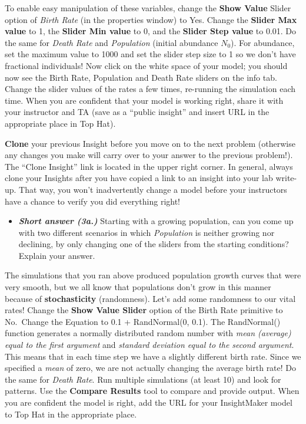 \documentclass[
]{article}
\providecommand{\tightlist}{%
  \setlength{\itemsep}{0pt}\setlength{\parskip}{0pt}}
\begin{document}
To enable easy manipulation of these variables, change the \textbf{Show
Value} Slider option of \emph{Birth Rate} (in the properties window) to
Yes. Change the \textbf{Slider Max value} to 1, the \textbf{Slider Min
value} to 0, and the \textbf{Slider Step value} to 0.01. Do the same for
\emph{Death Rate} and \emph{Population} (initial abundance \(N_0\)). For
abundance, set the maximum value to 1000 and set the slider step size to
1 so we don't have fractional individuals! Now click on the white space
of your model; you should now see the Birth Rate, Population and Death
Rate sliders on the info tab. Change the slider values of the rates a
few times, re-running the simulation each time. When you are confident
that your model is working right, share it with your instructor and TA
(save as a ``public insight'' and insert URL in the appropriate place in
Top Hat).

\textbf{Clone} your previous Insight before you move on to the next
problem (otherwise any changes you make will carry over to your answer
to the previous problem!). The ``Clone Insight'' link is located in the
upper right corner. In general, always clone your Insights after you
have copied a link to an insight into your lab write-up. That way, you
won't inadvertently change a model before your instructors have a chance
to verify you did everything right!

\begin{itemize}
\tightlist
\item
  \textbf{\emph{Short answer (3a.)}} Starting with a growing population,
  can you come up with two different scenarios in which
  \emph{Population} is neither growing nor declining, by only changing
  one of the sliders from the starting conditions? Explain your answer.
\end{itemize}

The simulations that you ran above produced population growth curves
that were very smooth, but we all know that populations don't grow in
this manner because of \textbf{stochasticity} (randomness). Let's add
some randomness to our vital rates! Change the \textbf{Show Value
Slider} option of the Birth Rate primitive to No.~Change the Equation to
0.1 + RandNormal(0, 0.1). The RandNormal() function generates a normally
distributed random number with \emph{mean (average) equal to the first
argument} and \emph{standard deviation equal to the second argument}.
This means that in each time step we have a slightly different birth
rate. Since we specified a \emph{mean} of zero, we are not actually
changing the average birth rate! Do the same for \emph{Death Rate}. Run
multiple simulations (at least 10) and look for patterns. Use the
\textbf{Compare Results} tool to compare and provide output. When you
are confident the model is right, add the URL for your InsightMaker
model to Top Hat in the appropriate place.
\end{document}
